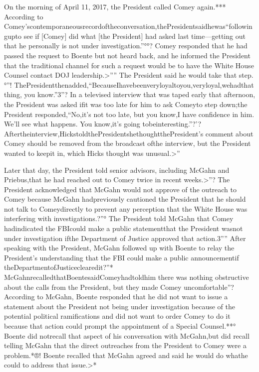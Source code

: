 On the morning of April 11, 2017, the President called Comey again.***
According to Comey’scontemporaneousrecordoftheconversation,thePresidentsaidhewas“followingupto see if [Comey] did what [the President] had asked last time—getting out that he personally is not under investigation.”°°?
Comey responded that he had passed the request to Boente but not heard back, and he informed the President that the traditional channel for such a request would be to have the White House Counsel contact DOJ leadership.>””
The President said he would take that step.°”!
ThePresidentthenadded,“BecauseIhavebeenveryloyaltoyou,veryloyal,wehadthat thing, you know.”3”?
In a televised interview that was taped early that afternoon, the President was asked ifit was too late for him to ask Comeyto step down;the President responded,“No,it’s not too late, but you know,I have confidence in him.
We’ll see what happens.
You know,it’s going tobeinteresting.”?’?
Aftertheinterview,HickstoldthePresidentshethoughtthePresident’s comment about Comey should be removed from the broadcast ofthe interview, but the President wanted to keepit in, which Hicks thought was unusual.>”

Later that day, the President told senior advisors, including McGahn and Priebus,that he had reached out to Comey twice in recent weeks.>”?
The President acknowledged that McGahn would not approve of the outreach to Comey because McGahn hadpreviously cautioned the President that he should not talk to Comeydirectly to prevent any perception that the White House was interfering with investigations.?”°
The President told McGahn that Comey hadindicated the FBIcould make a public statementthat the President wasnot under investigation ifthe Department of Justice approved that action.3””
After speaking with the President, McGahn followed up with Boente to relay the President’s understanding that the FBI could make a public announcementif theDepartmentofJusticeclearedit?”*
McGahnrecalledthatBoentesaidComeyhadtoldhim there was nothing obstructive about the calls from the President, but they made Comey uncomfortable”?
According to McGahn, Boente responded that he did not want to issue a statement about the President not being under investigation because of the potential political ramifications and did not want to order Comey to do it because that action could prompt the appointment of a Special Counsel.**°
Boente did notrecall that aspect of his conversation with McGahn,but did recall telling McGahn that the direct outreaches from the President to Comey were a problem.*®!
Boente recalled that McGahn agreed and said he would do whathe could to address that issue.>*


